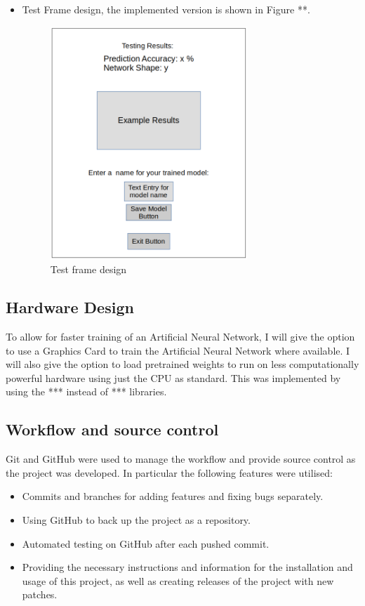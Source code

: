\documentclass[./project-report/src/latex/project-report.tex]{subfiles}
\begin{document}
\begin{itemize}
    \pagebreak
    
    \item Test Frame design, the implemented version is shown in Figure **.
        \begin{figure}[h!]
        \centering
        \includegraphics[width=0.7\textwidth]{./project-report/src/images/testing-frame-design.png}
        \caption{Test frame design}
        \label{fig:testing-frame-design}
        \end{figure}
\end{itemize}

\subsection{Hardware Design}

To allow for faster training of an Artificial Neural Network, I will give the option to use a Graphics Card to train the Artificial Neural Network where available. 
I will also give the option to load pretrained weights to run on less computationally powerful hardware using just the CPU as standard. This was implemented by using the *** 
instead of *** libraries.

\subsection{Workflow and source control}

Git and GitHub were used to manage the workflow and provide source control as the project was developed. In particular the following features were utilised:

\begin{itemize}
    \item Commits and branches for adding features and fixing bugs separately.
    \item Using GitHub to back up the project as a repository.
    \item Automated testing on GitHub after each pushed commit.
    \item Providing the necessary instructions and information for the installation and usage of this project, as well as creating releases of the project with new patches.
\end{itemize}
\end{document}
